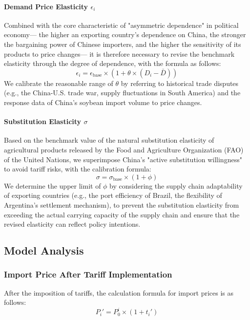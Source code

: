 \documentclass[12pt]{article}
\begin{document}
\paragraph{Demand Price Elasticity $\epsilon_i$}
Combined with the core characteristic of "asymmetric dependence" in political economy— the higher an exporting country's dependence on China, the stronger the bargaining power of Chinese importers, and the higher the sensitivity of its products to price changes— it is therefore necessary to revise the benchmark elasticity through the degree of dependence, with the formula as follows:
\[
\epsilon_i = \epsilon_{\text{base}} \times (1 + \theta \times (D_i - \bar{D}))
\]
We calibrate the reasonable range of $\theta$ by referring to historical trade disputes (e.g., the China-U.S. trade war, supply fluctuations in South America) and the response data of China's soybean import volume to price changes.

\paragraph{Substitution Elasticity $\sigma$}
Based on the benchmark value of the natural substitution elasticity of agricultural products released by the Food and Agriculture Organization (FAO) of the United Nations, we superimpose China's "active substitution willingness" to avoid tariff risks, with the calibration formula:
\[
\sigma = \sigma_{\text{base}} \times (1 + \phi)
\]
We determine the upper limit of $\phi$ by considering the supply chain adaptability of exporting countries (e.g., the port efficiency of Brazil, the flexibility of Argentina's settlement mechanism), to prevent the substitution elasticity from exceeding the actual carrying capacity of the supply chain and ensure that the revised elasticity can reflect policy intentions.

\subsection{Model Analysis}

\subsubsection{Import Price After Tariff Implementation}
After the imposition of tariffs, the calculation formula for import prices is as follows:
\begin{equation}
P_{i}' = P_{0}^{i} \times \left(1 + t_{i}'\right)
\end{equation}
\end{document}
